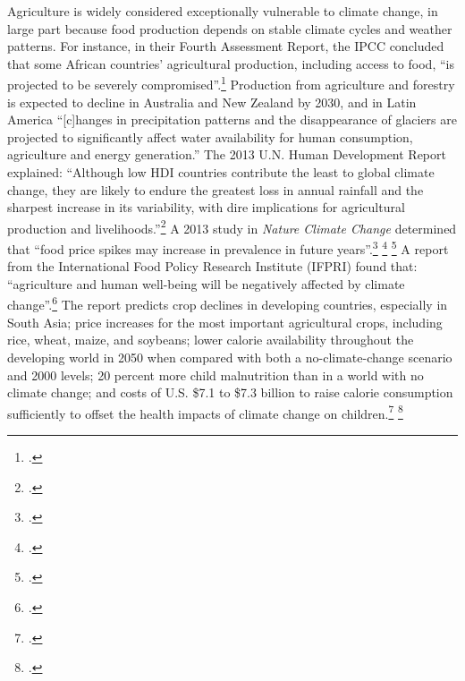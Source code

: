 Agriculture is widely considered exceptionally vulnerable to climate change, in large part because food production depends on stable climate cycles and weather patterns.
For instance, in their Fourth Assessment Report, the IPCC concluded that some African countries' agricultural production, including access to food, ``is projected to be severely compromised''.\footcite[][See: Synthesis report, Table SPM.2. Examples of some projected regional impacts. \url{https://www.ipcc.ch/publications_and_data/ar4/syr/en/spms3.html}]{IPCC2007}
Production from agriculture and forestry is expected to decline in Australia and New Zealand by 2030, and in Latin America ``[c]hanges in precipitation patterns and the disappearance of glaciers are projected to significantly affect water availability for human consumption, agriculture and energy generation.''
The 2013 U.N. Human Development Report explained: ``Although low HDI countries contribute the least to global climate change, they are likely to endure the greatest loss in annual rainfall and the sharpest increase in its variability, with dire implications for agricultural production and livelihoods.''\footcite[][p. 6]{UNHumanDev2013}
A 2013 study in \emph{Nature Climate Change} determined that ``food price spikes may increase in prevalence in future years''.\footcite[][p. 1]{Iizumi2013} \footcite[][]{IPCCExtremeEvents} \footcite[][p. 271--289]{Funk2009}
A report from the International Food Policy Research Institute (IFPRI) found that: ``agriculture and human well-being will 
be negatively affected by climate change''.\footcite[][p. vii]{IFPRIAgri}
The report predicts crop declines in developing countries, especially in South Asia; price increases for the most important agricultural crops, including rice, wheat, maize, and soybeans; lower calorie availability throughout the developing world in 2050 when compared with both a no-climate-change scenario and 2000 levels; 20 percent more child malnutrition than in a world with no climate change; and costs of U.S. \$7.1 to \$7.3 billion to raise calorie consumption sufficiently to offset the health impacts of climate change on children.\footcite[][p. vii]{IFPRIAgri} \footcite[See also: ][]{Wheeler2013}



